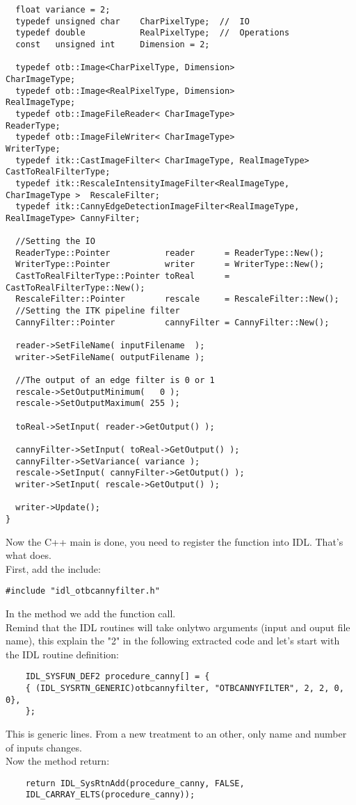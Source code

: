 \begin{verbatim}
  float variance = 2;
  typedef unsigned char    CharPixelType;  //  IO
  typedef double           RealPixelType;  //  Operations
  const   unsigned int     Dimension = 2;
  
  typedef otb::Image<CharPixelType, Dimension>                             CharImageType;
  typedef otb::Image<RealPixelType, Dimension>                             RealImageType;
  typedef otb::ImageFileReader< CharImageType>                             ReaderType;
  typedef otb::ImageFileWriter< CharImageType>                             WriterType;
  typedef itk::CastImageFilter< CharImageType, RealImageType>              CastToRealFilterType;
  typedef itk::RescaleIntensityImageFilter<RealImageType, CharImageType >  RescaleFilter;
  typedef itk::CannyEdgeDetectionImageFilter<RealImageType, RealImageType> CannyFilter;
  
  //Setting the IO
  ReaderType::Pointer           reader      = ReaderType::New();
  WriterType::Pointer           writer      = WriterType::New();
  CastToRealFilterType::Pointer toReal      = CastToRealFilterType::New();
  RescaleFilter::Pointer        rescale     = RescaleFilter::New();
  //Setting the ITK pipeline filter
  CannyFilter::Pointer          cannyFilter = CannyFilter::New();
  
  reader->SetFileName( inputFilename  );
  writer->SetFileName( outputFilename );
  
  //The output of an edge filter is 0 or 1
  rescale->SetOutputMinimum(   0 );
  rescale->SetOutputMaximum( 255 );
  
  toReal->SetInput( reader->GetOutput() );
  
  cannyFilter->SetInput( toReal->GetOutput() );
  cannyFilter->SetVariance( variance );
  rescale->SetInput( cannyFilter->GetOutput() );
  writer->SetInput( rescale->GetOutput() );
  
  writer->Update();
}
\end{verbatim}
Now the C++ main is done, you need to register the function into IDL. That's what  does.
\\
First, add the include:
\begin{verbatim}
#include "idl_otbcannyfilter.h"
\end{verbatim}
In the  method we add the function call.\\
Remind that the IDL routines will take onlytwo arguments (input and ouput file name), this explain the "2" in the following extracted code and let's start with the IDL routine definition:
\begin{verbatim}
	IDL_SYSFUN_DEF2 procedure_canny[] = {  
	{ (IDL_SYSRTN_GENERIC)otbcannyfilter, "OTBCANNYFILTER", 2, 2, 0, 0},  
	}; 
\end{verbatim}
This is generic lines. From a new treatment to an other, only name and number of inputs changes.\\
Now the method return:
\begin{verbatim}
    return IDL_SysRtnAdd(procedure_canny, FALSE,   
	IDL_CARRAY_ELTS(procedure_canny));
\end{verbatim}

